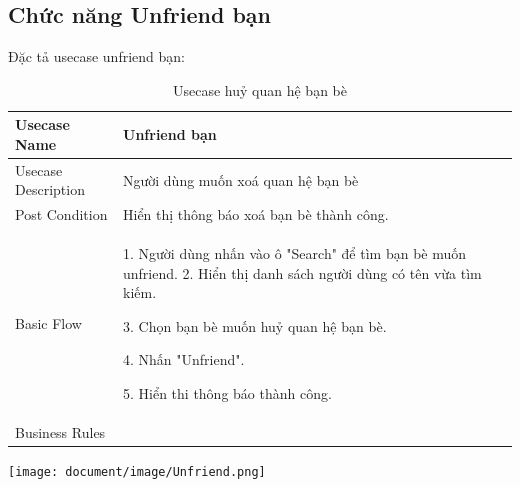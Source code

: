 \subsection{Chức năng Unfriend bạn}
Đặc tả usecase unfriend bạn: 
\begin{table}[H]
    \centering
	\begin{tabular}{|p{5cm}|p{10cm}|}
    
    \hline
    Usecase Name&Unfriend bạn\\
    \hline
    Usecase Description&Người dùng muốn xoá quan hệ bạn bè\\
    \hline
    Post Condition&Hiển thị thông báo xoá bạn bè thành công. \\
    \hline
    Basic Flow& 1. Người dùng nhấn vào ô "Search" để tìm bạn bè muốn unfriend.
    2. Hiển thị danh sách người dùng có tên vừa tìm kiếm.
    
    3. Chọn bạn bè muốn huỷ quan hệ bạn bè.
    
    4. Nhấn "Unfriend".
    
    5. Hiển thi thông báo thành công.\\
    

    \hline Business Rules& \\
   
   
	\hline
\end{tabular}
\caption{Usecase huỷ quan hệ bạn bè}
\end{table}
 \begin{center}
  \captionsetup{type=figure}
  \texttt{[image: document/image/Unfriend.png]}
\end{center}

